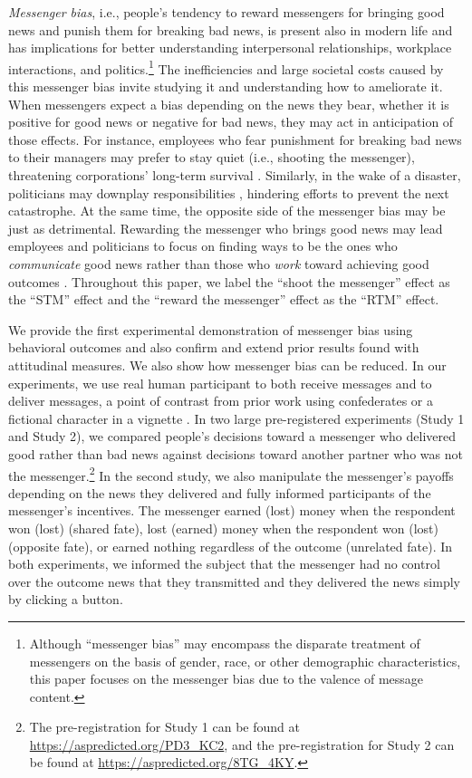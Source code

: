 \emph{Messenger bias}, i.e., people's tendency to reward messengers for
bringing good news and punish them for breaking bad news, is present
also in modern life and has implications for better understanding
interpersonal relationships, workplace interactions, and
politics.\footnote{Although ``messenger bias'' may encompass the
  disparate treatment of messengers on the basis of gender, race, or
  other demographic characteristics, this paper focuses on the messenger
  bias due to the valence of message content.} The inefficiencies and
large societal costs caused by this messenger bias invite studying it
and understanding how to ameliorate it. When messengers expect a bias
depending on the news they bear, whether it is positive for good news or
negative for bad news, they may act in anticipation of those effects.
For instance, employees who fear punishment for breaking bad news to
their managers may prefer to stay quiet (i.e., shooting the messenger),
threatening corporations' long-term survival \citep{charan2002companies}.
Similarly, in the wake of a disaster, politicians may downplay
responsibilities \citep{liu2020framing}, hindering efforts to prevent the
next catastrophe. At the same time, the opposite side of the messenger
bias may be just as detrimental. Rewarding the messenger who brings good
news may lead employees and politicians to focus on finding ways to be
the ones who \emph{communicate} good news rather than those who
\emph{work} toward achieving good outcomes \citep[see, e.g.,][]{grimmer2014impression}.
Throughout this paper, we label the ``shoot the
messenger'' effect as the ``STM'' effect and the ``reward the
messenger'' effect as the ``RTM'' effect.

We provide the first experimental demonstration of messenger bias using
behavioral outcomes and also confirm and extend prior results found with
attitudinal measures. We also show how messenger bias
can be reduced. In our experiments, we use real human participant to
both receive messages and to deliver messages, a point of contrast from
prior work using confederates or a fictional character in a vignette \citep{kuhlen2013language}. 
In two large pre-registered experiments (Study 1 and Study 2), we compared
people's decisions toward a messenger who delivered good rather than bad
news against decisions toward another partner who was not the messenger.\footnote{The 
pre-registration for Study 1 can be found at \url{https://aspredicted.org/PD3_KC2}, 
and the pre-registration for Study 2 can be found at 
\url{https://aspredicted.org/8TG_4KY}.} 
 In
the second study, we also manipulate the messenger's payoffs depending
on the news they delivered and fully informed participants of the
messenger's incentives. The messenger earned (lost) money when the
respondent won (lost) (shared fate), lost (earned) money when the respondent
won (lost) (opposite fate), or earned nothing regardless of the outcome
(unrelated fate). In both experiments, we informed the subject that the
messenger had no control over the outcome news that they transmitted and
they delivered the news simply by clicking a button.

